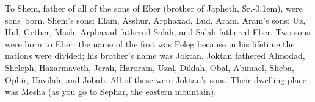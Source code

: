 \begin{inparaenum}
     To Shem, father of all of the sons of Eber (brother of Japheth, Sr.\kern-0.1em), were sons\understood\ born.%
     Shem's sons: Elam, Asshur, Arphaxad, Lud, Aram.%
     Aram's sons: Uz, Hul, Gether, Mash.%
     Arphaxad fathered Salah, and Salah fathered Eber.%
     Two sons were born to Eber: the name of the first was Peleg because in his lifetime the nations were divided; his brother's name was Joktan.%
     Joktan fathered Almodad, Sheleph, Hazarmaveth, Jerah,%
     Haroram, Uzal, Diklah,%
     Obal, Abimael, Sheba,%
     Ophir, Havilah, and Jobab. All of these were Joktan's sons.%
     Their dwelling place was Mesha (as you go to Sephar, the eastern mountain).%
\end{inparaenum}
